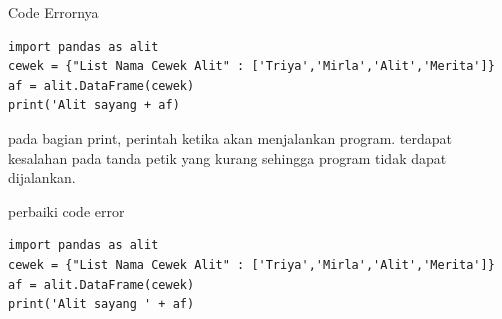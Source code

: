 Code Errornya 
\begin{verbatim}
import pandas as alit
cewek = {"List Nama Cewek Alit" : ['Triya','Mirla','Alit','Merita']}
af = alit.DataFrame(cewek)
print('Alit sayang + af)
\end{verbatim}
\par
pada bagian print, perintah ketika akan menjalankan program. terdapat kesalahan pada tanda petik yang kurang sehingga program tidak dapat dijalankan. 

\par perbaiki code error
\begin{verbatim}
import pandas as alit
cewek = {"List Nama Cewek Alit" : ['Triya','Mirla','Alit','Merita']}
af = alit.DataFrame(cewek)
print('Alit sayang ' + af)
\end{verbatim}

